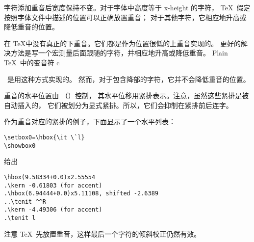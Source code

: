 \documentclass{book}
\begin{document}
字符添加重音后宽度保持不变。对于字体中高度等于 x-height 的字符，
\TeX\ 假定按照字体文件中描述的位置可以正确放置重音；
对于其他字符，它相应地升高或降低重音的位置。

在 \TeX 中没有真正的下重音。它们都是作为位置很低的上重音实现的。
更好的解决方法是写一个宏测量后面跟随的字符，并相应地升高或降低重音。
Plain \TeX\ 中的变音符 \cstoidx c\par\ 是用这种方式实现的。
然而，对于包含降部的字符，它并不会降低重音的位置。

重音的水平位置由 （）控制，
其水平位移用紧排表示。注意，虽然这些紧排是被自动插入的，
它们被划分为{\italic 显式\/}紧排。所以，它们会抑制在紧排前后连字。

作为重音对应的紧排的例子，下面显示了一个水平列表：
\begin{verbatim}
\setbox0=\hbox{\it \`l}
\showbox0
\end{verbatim}
给出
\begin{verbatim}
\hbox(9.58334+0.0)x2.55554
.\kern -0.61803 (for accent)
.\hbox(6.94444+0.0)x5.11108, shifted -2.6389
..\tenit ^^R
.\kern -4.49306 (for accent)
.\tenit l
\end{verbatim}
注意 \TeX\ 先放置重音，这样最后一个字符的倾斜校正仍然有效。
\end{document}
